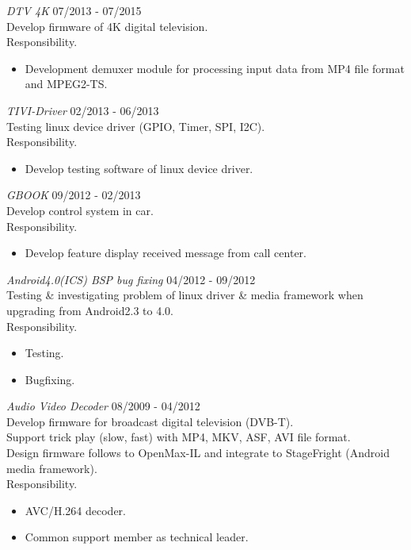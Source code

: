 \documentclass[margin]{res}
\begin{document}
\begin{resume}
                {\sl DTV 4K} \hfill            07/2013 - 07/2015 \\
		 Develop firmware of 4K digital television.\\
		 Responsibility.
                 \begin{itemize}  \itemsep -2pt %
                 \item Development demuxer module for processing input data from MP4 file format and MPEG2-TS.
                 \end{itemize}

                {\sl TIVI-Driver} \hfill            02/2013 - 06/2013 \\
		 Testing linux device driver (GPIO, Timer, SPI, I2C).\\
		 Responsibility.
                 \begin{itemize}  \itemsep -2pt %
                 \item Develop testing software of linux device driver.
                 \end{itemize}

                {\sl GBOOK} \hfill            09/2012 - 02/2013 \\
		 Develop control system in car.\\
		 Responsibility.
                 \begin{itemize}  \itemsep -2pt %
                 \item Develop feature display received message from call center.
                 \end{itemize}

                {\sl Android4.0(ICS) BSP bug fixing} \hfill            04/2012 - 09/2012\\
		 Testing \& investigating problem of linux driver \& media framework when upgrading from Android2.3 to 4.0.\\
		 Responsibility.
                 \begin{itemize}  \itemsep -2pt %
                 \item Testing.
                 \item Bugfixing.
                 \end{itemize}

                {\sl Audio Video Decoder} \hfill            08/2009 - 04/2012 \\
                 Develop firmware for broadcast digital television (DVB-T).\\
                 Support trick play (slow, fast) with MP4, MKV, ASF, AVI file format.\\
                 Design firmware follows to OpenMax-IL and integrate to StageFright (Android media framework).\\
		 Responsibility.
                 \begin{itemize}  \itemsep -2pt %
                 \item AVC/H.264 decoder.
                 \item Common support member as technical leader.
        	 \end{itemize}



\end{resume}
\end{document}
